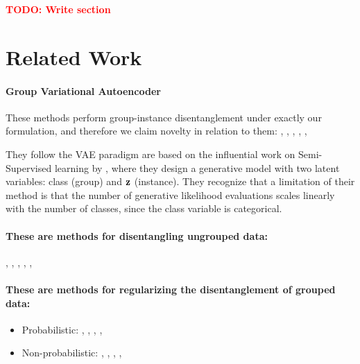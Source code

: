 \documentclass{article}
\newcommand{\todo}[1]{\textcolor{red}{\textbf{TODO: #1}}}
\begin{document}
\todo{Write section}

\section{Related Work}

\paragraph{Group Variational Autoencoder}
These methods perform group-instance disentanglement under exactly our formulation, and therefore we claim novelty in relation to them: \cite{Bouchacourt2018MultiLevelVA}, \cite{Hosoya2019GroupbasedLO}, \cite{Hsu2017UnsupervisedLO}, \cite{Li2018DisentangledSA}, \cite{Esmaeili2019StructuredDR}, \cite{Nmeth2020AdversarialDW}

They follow the VAE paradigm \citep{Kingma2014AutoEncodingVB, Rezende2014StochasticBA} are based on the influential work on Semi-Supervised learning by \citet{kingma2014semi}, where they design a generative model with two latent variables: class (group) and ${\mathbf{z}}$ (instance). They recognize that a limitation of their method is that the number of generative likelihood evaluations scales linearly with the number of classes, since the class variable is categorical.

\paragraph{These are methods for disentangling ungrouped data:}

\cite{Higgins2017betaVAELB}, \cite{Kumar2018VariationalIO}, \cite{Kim2018DisentanglingBF}, \cite{Chen2018IsolatingSO}, \cite{Esmaeili2019StructuredDR}, \cite{Mathieu2019DisentanglingDI}

\paragraph{These are methods for regularizing the disentanglement of grouped data:}
\begin{itemize}
    \item Probabilistic: \cite{Ruiz2019LearningDR}, \cite{Shu2020WeaklySD}, \cite{Chen2020WeaklySD}, \cite{Nmeth2020AdversarialDW}, \cite{Hsieh2018LearningTD}
    \item Non-probabilistic: \cite{Denton2017UnsupervisedLO}, \cite{Esser2019UnsupervisedRD}, \cite{Liu2019FewShotUI}, \cite{Kotovenko2019ContentAS}, \cite{Gabbay2020DemystifyingID}
\end{itemize}
\end{document}
